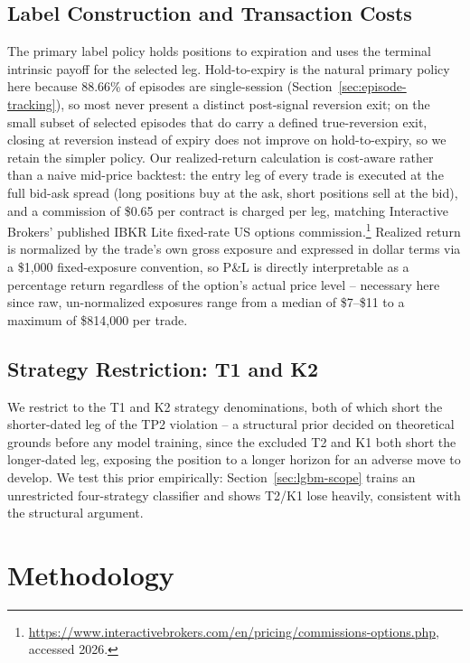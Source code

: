 \documentclass[sigconf,review,anonymous]{acmart}
\begin{document}
\subsection{Label Construction and Transaction Costs}
\label{sec:labels}
The primary label policy holds positions to expiration and uses the terminal intrinsic payoff for the selected leg. Hold-to-expiry is the natural primary policy here because 88.66\% of episodes are single-session (Section~\ref{sec:episode-tracking}), so most never present a distinct post-signal reversion exit; on the small subset of selected episodes that do carry a defined true-reversion exit, closing at reversion instead of expiry does not improve on hold-to-expiry, so we retain the simpler policy. Our realized-return calculation is cost-aware rather than a naive mid-price backtest: the entry leg of every trade is executed at the full bid-ask spread (long positions buy at the ask, short positions sell at the bid), and a commission of \$0.65 per contract is charged per leg, matching Interactive Brokers' published IBKR Lite fixed-rate US options commission.\footnote{\url{https://www.interactivebrokers.com/en/pricing/commissions-options.php}, accessed 2026.} Realized return is normalized by the trade's own gross exposure and expressed in dollar terms via a \$1{,}000 fixed-exposure convention, so P\&L is directly interpretable as a percentage return regardless of the option's actual price level -- necessary here since raw, un-normalized exposures range from a median of \$7--\$11 to a maximum of \$814{,}000 per trade.

\subsection{Strategy Restriction: T1 and K2}
We restrict to the T1 and K2 strategy denominations, both of which short the shorter-dated leg of the TP2 violation -- a structural prior decided on theoretical grounds before any model training, since the excluded T2 and K1 both short the longer-dated leg, exposing the position to a longer horizon for an adverse move to develop. We test this prior empirically: Section~\ref{sec:lgbm-scope} trains an unrestricted four-strategy classifier and shows T2/K1 lose heavily, consistent with the structural argument.

\section{Methodology}
\label{sec:method}
\end{document}

